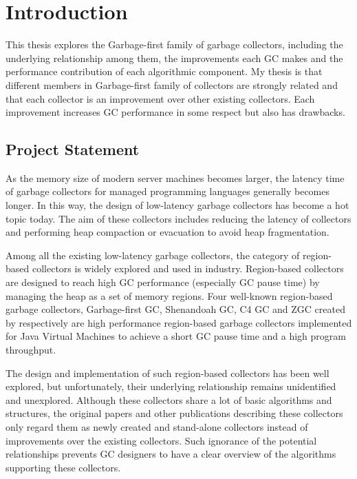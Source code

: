 \chapter{Introduction}
\label{cha:intro}

This thesis explores the Garbage-first family of garbage collectors, including
the underlying relationship among them, the improvements each GC makes and the performance
contribution of each algorithmic component.
My thesis is that different members in Garbage-first family of collectors are strongly related
and that each collector is an improvement over other existing collectors.
Each improvement increases GC performance in some respect but also has drawbacks.

\section{Project Statement}

As the memory size of modern server machines becomes larger, the latency time of
garbage collectors for managed programming languages generally becomes longer.
In this way, the design of low-latency garbage collectors has become
a hot topic today. The aim of these collectors includes reducing the latency of collectors and
performing heap compaction or evacuation to avoid heap fragmentation.

Among all the existing low-latency garbage collectors, the category of region-based
collectors is widely explored and used in industry.
Region-based collectors are designed to reach high GC
performance (especially GC pause time) by managing the heap as a set of memory regions.
Four well-known region-based garbage collectors,
Garbage-first GC, Shenandoah GC, C4 GC and ZGC created by
\cite{detlefs2004garbage,flood2016shenandoah,tene2011c4,liden_karlsson_2018} respectively
are high performance region-based garbage collectors implemented for Java Virtual Machines
to achieve a short GC pause time and a high program throughput.

The design and implementation of such region-based collectors has been well
explored, but unfortunately, their underlying relationship remains unidentified and unexplored.
Although these collectors share a lot of basic algorithms and structures,
the original papers and other publications describing these collectors only regard them as
newly created and stand-alone collectors instead of improvements over the existing collectors.
Such ignorance of the potential relationships prevents GC designers to have a clear
overview of the algorithms supporting these collectors.


